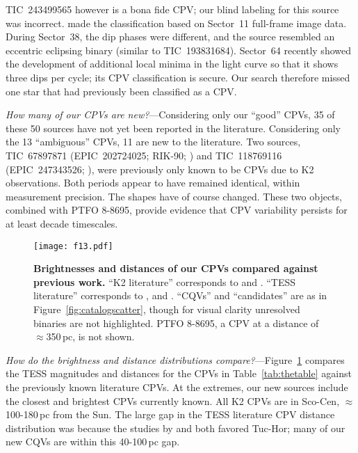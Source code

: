 \documentclass[11pt,twocolumn,tighten]{aastex63}
\begin{document}
TIC~243499565 however is a bona fide CPV; our blind labeling for this
source was incorrect.  \citet{2021AJ....161...60S} made the
classification based on Sector~11 full-frame image data.  During
Sector~38, the dip phases were different, and the source
resembled an eccentric eclipsing binary (similar to TIC~193831684).  Sector~64 recently showed
the development of additional local minima in the light curve so that
it shows three dips per cycle; its CPV classification is secure.  Our
search therefore missed one star that had previously been classified
as a CPV.

{\it How many of our CPVs are new?}---Considering only our ``good''
CPVs, 35 of these 50 sources have not yet been reported in the
literature.  Considering only the 13 ``ambiguous'' CPVs, 11 are new to
the literature.  Two sources, TIC~67897871 (EPIC~202724025; RIK-90;
\citealt{2017AJ....153..152S}) and TIC~118769116 (EPIC~247343526;
\citealt{2017AJ....153..152S}), were previously only known to be CPVs
due to K2 observations.  Both periods appear to have remained
identical, within measurement precision.  The shapes have of course changed.
These two objects, combined with PTFO 8-8695, provide evidence
that CPV variability persists for at least decade timescales.


\begin{figure}[!t]
	\begin{center}
		\centering
		\texttt{[image: f13.pdf]}
		\vspace{-0.2cm}
		\caption{
			{\bf Brightnesses and distances of our CPVs compared
      against previous work.}  
      ``K2 literature'' corresponds to \citet{2017AJ....153..152S} and
      \citet{2018AJ....155...63S}.  ``TESS literature'' corresponds to
      \citet{2019ApJ...876..127Z,2021AJ....161...60S,2022AJ....163..144G}, and \citet{2023ApJ...945..114P}.
      ``CQVs'' and ``candidates'' are as in
      Figure~\ref{fig:catalogscatter}, though for visual clarity
      unresolved binaries are not highlighted.  PTFO 8-8695, a CPV at
      a distance of $\approx$350\,pc, is not shown.
		}
			\vspace{-0.5cm}
		\label{fig:tmagvsdist}
	\end{center}
\end{figure}



{\it How do the brightness and distance distributions
compare?}---Figure~\ref{fig:tmagvsdist} compares the TESS magnitudes
and distances for the CPVs in Table~\ref{tab:thetable} against the
previously known literature CPVs.  At the extremes, our new sources
include the closest and brightest CPVs currently known. 
All K2 CPVs are in Sco-Cen,
$\approx$100-180\,pc from the Sun.  The large gap in the TESS literature CPV
distance distribution was because the studies by
\citep{2019ApJ...876..127Z} and \citet{2023ApJ...945..114P} both
favored Tuc-Hor; many of our new CQVs are within this 40-100\,pc gap.
\end{document}
